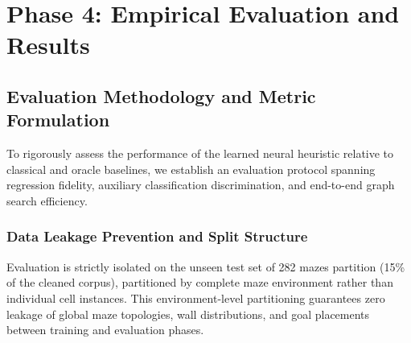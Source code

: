 
\section{Phase 4: Empirical Evaluation and Results}

\subsection{Evaluation Methodology and Metric Formulation}
To rigorously assess the performance of the learned neural heuristic relative to classical
and oracle baselines, we establish an evaluation protocol spanning regression fidelity, auxiliary
classification discrimination, and end-to-end graph search efficiency.

\subsubsection{Data Leakage Prevention and Split Structure}
Evaluation is strictly isolated on the unseen test set of 282 mazes partition (15\% of
the cleaned corpus), partitioned by complete maze environment rather than individual cell
instances. This environment-level partitioning guarantees zero leakage of global maze
topologies, wall distributions, and goal placements between training and evaluation phases.


